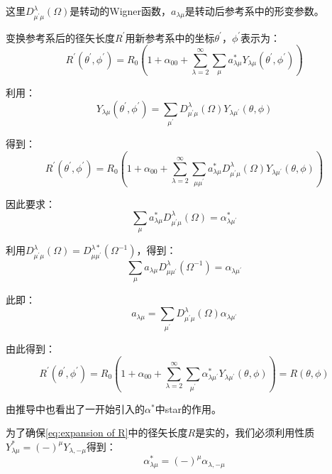 这里$D^{\lambda}_{\mu^{\prime}\mu}(\Omega)$是转动的Wigner函数，$a_{\lambda\mu}$是转动后参考系中的形变参数。
\begin{booknote*}
变换参考系后的径矢长度$R^{\prime}$用新参考系中的坐标$\theta^{\prime}$，$\phi^{\prime}$表示为：
\[
R^{\prime}(\theta^{\prime},\phi^{\prime})=R_{0}\left(1+\alpha_{00}+\sum^{\infty}_{\lambda=2}\sum_{\mu}a^{*}_{\lambda\mu}Y_{\lambda\mu}(\theta^{\prime},\phi^{\prime})\right)
\]

利用：
\[
Y_{\lambda\mu}(\theta^{\prime},\phi^{\prime})=\sum_{\mu^{\prime}}D^{\lambda}_{\mu^{\prime}\mu}(\Omega)Y_{\lambda\mu^{\prime}}(\theta,\phi)
\]

得到：
\[
R^{\prime}(\theta^{\prime},\phi^{\prime})=R_{0}\left(1+\alpha_{00}+\sum^{\infty}_{\lambda=2}\sum_{\mu\mu^{\prime}}a^{*}_{\lambda\mu}D^{\lambda}_{\mu^{\prime}\mu}(\Omega)Y_{\lambda\mu^{\prime}}(\theta,\phi)\right)
\]

因此要求：
\[
\sum_{\mu}a^{*}_{\lambda\mu}D^{\lambda}_{\mu^{\prime}\mu}(\Omega)=\alpha^{*}_{\lambda\mu^{\prime}}
\]

利用$D^{\lambda}_{\mu^{\prime}\mu}(\Omega)=D^{\lambda*}_{\mu\mu^{\prime}}(\Omega^{-1})$，得到：
\[
\sum_{\mu}a_{\lambda\mu}D^{\lambda}_{\mu\mu^{\prime}}(\Omega^{-1})=\alpha_{\lambda\mu^{\prime}}
\]

此即：
\[
a_{\lambda\mu}=\sum_{\mu^{\prime}}D^{\lambda}_{\mu^{\prime}\mu}(\Omega)\alpha_{\lambda\mu^{\prime}}
\]

由此得到：
\[
R^{\prime}(\theta^{\prime},\phi^{\prime})=R_{0}\left(1+\alpha_{00}+\sum^{\infty}_{\lambda=2}\sum_{\mu^{\prime}}\alpha^{*}_{\lambda\mu^{\prime}}Y_{\lambda\mu^{\prime}}(\theta,\phi)\right)=R(\theta,\phi)
\]

由推导中也看出了一开始引入的$\alpha^{*}$中star的作用。
\end{booknote*}
为了确保\ref{eq:expansion of R}中的径矢长度$R$是实的，我们必须利用性质$Y^{*}_{\lambda\mu}=(-)^{\mu}Y_{\lambda,-\mu}$得到：
\[
\alpha^{*}_{\lambda\mu}=(-)^{\mu}\alpha_{\lambda,-\mu}
\]

